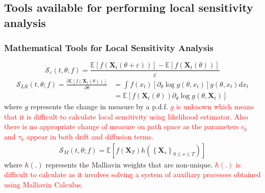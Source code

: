 \documentclass[a4paper,10pt]{beamer}
\newcommand{\BS}[1]{\boldsymbol{#1}}
\newcommand{\E}[1]{\mathbb{E}\left[ #1 \right]}
\newcommand{\sqb}[1]{\left[ #1 \right]}
\newcommand{\rb}[1]{\left( #1 \right)}
\newcommand{\cb}[1]{\left \{ #1 \right \}}
\begin{document}
	\begin{frame}
		\subsection{Tools available for performing local sensitivity analysis}
		\frametitle{Mathematical Tools for Local Sensitivity Analysis}
			\footnotesize
			$$ \mathcal{S}_{\varepsilon}\rb{t,\theta;f} = \frac{\E{f\rb{\BS{X}_{t}\rb{\theta + \varepsilon}}} - \E{f\rb{\BS{X}_{t}\rb{\theta}}}}{\varepsilon} $$
			\begin{align*}
				\mathcal{S}_{LR}\rb{t,\theta;f} = \frac{\partial \E{f\rb{\BS{X}_{t}\rb{\theta}}}}{\partial \theta} &= \int f\rb{x_{t}} \sqb{\partial_{\theta} \log g\rb{\theta,x_{t}}} g\rb{\theta,x_{t}} dx_{t} \\
				\, &= \E{f\rb{\BS{X}_{t}\rb{\theta}} \partial_{\theta} \log g \rb{\theta,\BS{X}_{t}}}
			\end{align*}
			where $g$ represents the change in measure by a p.d.f. \textcolor{red}{$g$ is unknown which means that it is difficult to calculate local sensitivity using likelihood estimator. Also there is no appropriate change of measure on path space as the parameters $c_{k}$ and $\tau_{k}$ appear in both drift and diffusion terms.} \\
			\vspace{0.2cm}
			\begin{align*}
				\mathcal{S}_{M}\rb{t,\theta;f} = \E{f\rb{\BS{X}_{T}}h\rb{\cb{\BS{X}_{s}}_{0 \leq s \leq T}}}
			\end{align*}
			where $h\rb{.}$ represents the Malliavin weights that are non-unique. \textcolor{red}{$h(.)$ is difficult to calculate as it involves solving a system of auxiliary processes obtained using Malliavin Calculus.} 
	\end{frame}
\end{document}
